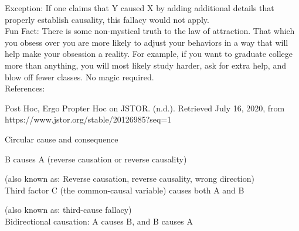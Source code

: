 \documentclass[a4paper,12pt,single,pdftex]{scrbook}
\begin{document}
      
        Exception: If one claims that Y caused X by adding additional details that properly establish causality, this fallacy would not apply.
      \\

      
        Fun Fact: There is some non-mystical truth to the law of attraction. That which you obsess over you are more likely to adjust your behaviors in a way that will help make your obsession a reality. For example, if you want to graduate college more than anything, you will most likely study harder, ask for extra help, and blow off fewer classes. No magic required.
      \\

    
    References:

    
      Post Hoc, Ergo Propter Hoc on JSTOR. (n.d.). Retrieved July 16, 2020, from https://www.jstor.org/stable/20126985?seq=1
    
  

Circular cause and consequence

B causes A (reverse causation or reverse causality)
    
      (also known as: Reverse causation, reverse causality, wrong direction)
    \\

  

Third factor C (the common-causal variable) causes both A and B
    
      (also known as: third-cause fallacy)
    \\

  

Bidirectional causation: A causes B, and B causes A
\end{document}
